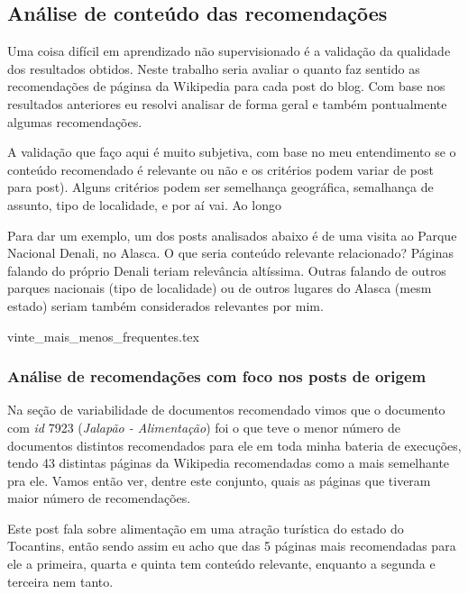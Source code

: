 \subsection{Análise de conteúdo das recomendações}

Uma coisa difícil em aprendizado não supervisionado é a validação da qualidade dos resultados obtidos. Neste trabalho seria avaliar o quanto faz sentido as recomendações 
de páginsa da Wikipedia para cada post do blog. Com base nos resultados anteriores eu resolvi analisar de forma geral e também pontualmente algumas
recomendações. 

A validação que faço aqui é muito subjetiva, com base no meu entendimento se o conteúdo recomendado é relevante ou não e os critérios
podem variar de post para post). Alguns critérios podem ser semelhança geográfica, semalhança de assunto, tipo de localidade, e por aí vai. Ao longo 

Para dar um exemplo, um dos posts analisados abaixo é de uma visita ao Parque Nacional Denali, no Alasca. O que seria conteúdo relevante relacionado?
Páginas falando do próprio Denali teriam relevância altíssima. Outras falando de outros parques nacionais (tipo de localidade) ou de outros lugares
do Alasca (mesm estado) seriam também considerados relevantes por mim.

{vinte_mais_menos_frequentes.tex}

\subsubsection{Análise de recomendações com foco nos posts de origem}

Na seção de variabilidade de documentos recomendado vimos que o documento com \textit{id} 7923 (\textit{Jalapão - Alimentação}) foi o que teve o menor número de documentos distintos recomendados
para ele em toda minha bateria de execuções, tendo 43 distintas páginas da Wikipedia recomendadas como a mais semelhante pra ele. Vamos então ver,
dentre este conjunto, quais as páginas que tiveram maior número de recomendações.

Este post fala sobre alimentação em uma atração turística do estado do Tocantins, então sendo assim eu acho que das 5 páginas mais recomendadas para 
ele a primeira, quarta e quinta tem conteúdo relevante, enquanto a segunda e terceira nem tanto.


